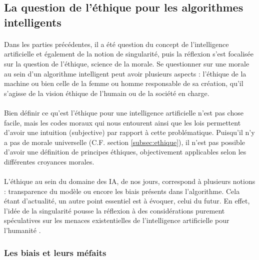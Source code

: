 \documentclass[10pt, french, a4paper]{article}
\begin{document}

\subsection{La question de l'éthique pour les algorithmes intelligents}
\label{subsec:ia_ethique}

\paragraph{}
Dans les parties précédentes, il a été question du concept de l’intelligence artificielle et également de la notion de singularité, puis la réflexion s’est focalisée sur la question de l’éthique, science de la morale. Se questionner sur une morale au sein d’un algorithme intelligent peut avoir plusieurs aspects : l’éthique de la machine ou bien celle de la femme ou homme responsable de sa création, qu’il s’agisse de la vision éthique de l’humain ou de la société en charge.

\paragraph{}
Bien définir ce qu'est l'éthique pour une intelligence artificielle n'est pas chose facile, mais les codes moraux qui nous entourent ainsi que les lois permettent d'avoir une intuition (subjective) par rapport à cette problématique. Puisqu'il n'y a pas de morale universelle (C.F. section \ref{subsec:ethique}), il n'est pas possible d'avoir une définition de principes éthiques, objectivement applicables selon les différentes croyances morales.

\paragraph{}
L’éthique au sein du domaine des IA, de nos jours, correspond à plusieurs notions : transparence du modèle ou encore les biais présents dans l’algorithme. Cela étant d’actualité, un autre point essentiel est à évoquer, celui du futur. En effet, l’idée de la singularité pousse la réflexion à des considérations purement spéculatives sur les menaces existentielles de l’intelligence artificielle pour l’humanité \citep{villani_donner_2018}.

\subsubsection{Les biais et leurs méfaits}
\end{document}
